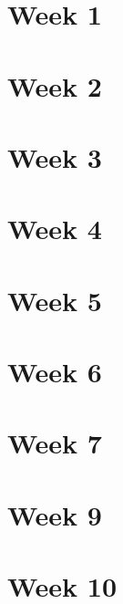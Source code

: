 \documentclass[letterpaper,12pt]{article}
\begin{document}
\renewcommand{\week}{Week 1}
\section*{\week}

\clearpage

\renewcommand{\week}{Week 2}
\section*{\week}

\clearpage

\renewcommand{\week}{Week 3}
\section*{\week}

\clearpage

\renewcommand{\week}{Week 4}
\section*{\week}

\clearpage

\renewcommand{\week}{Week 5}
\section*{\week}

\clearpage

\renewcommand{\week}{Week 6}
\section*{\week}

\clearpage

\renewcommand{\week}{Week 7}
\section*{\week}

\clearpage

%

\renewcommand{\week}{Week 9}
\section*{\week}

\clearpage

\renewcommand{\week}{Week 10}
\section*{\week}

\clearpage
\end{document}
